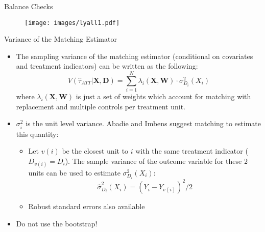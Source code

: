 \documentclass{beamer}
\numberwithin{equation}{section}
\begin{document}
\begin{frame}{Balance Checks}

\begin{figure}[ht] \centering
    \texttt{[image: images/lyall1.pdf]}
\end{figure}

\end{frame}

\begin{frame}{Variance of the Matching Estimator}

\begin{itemize}
\itemsep1pt\parskip0pt
\item
  The sampling variance of the matching estimator (conditional on
  covariates and treatment indicators) can be written as the following:
  \[ V(\hat \tau_{ATT} | \mathbf{X}, \mathbf{D}) = \sum_{i=1}^{N} \lambda_i(\mathbf{X}, \mathbf{W}) \cdot \sigma^2_{D_i}(X_i)\]
  where $\lambda_i(\mathbf{X}, \mathbf{W})$ is just a set of weights which
  account for matching with replacement and multiple controls per
  treatment unit. \pause
\item
  $\sigma^2_i$ is the unit level variance. Abadie and Imbens suggest
  matching to estimate this quantity:

  \begin{itemize}
  \itemsep1pt\parskip0pt
  \item
    Let $v(i)$ be the closest unit to $i$ with the same treatment
    indicator ($D_{v(i)} = D_i$). The sample variance of the outcome
    variable for these 2 units can be used to estimate
    $\sigma^2_{D_i}(X_i)$:
    \[ \hat \sigma^2_{D_i}(X_i) = (Y_i - Y_{v(i)})^2 / 2 \] 
    \item Robust standard errors also available\pause
  \end{itemize}
\item
  Do not use the bootstrap!
\end{itemize}

\end{frame}
\end{document}
